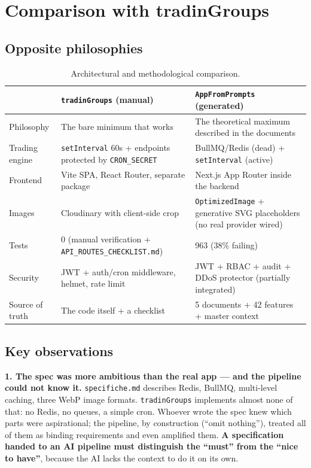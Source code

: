 \documentclass[11pt,a4paper]{article}
\newcommand{\file}[1]{\texttt{\small #1}}
\begin{document}
\section{Comparison with tradinGroups}

\subsection{Opposite philosophies}

\begin{table}[h!]
\centering
\small
\begin{tabular}{p{4.2cm}p{4.9cm}p{4.9cm}}
\toprule
& \textbf{\file{tradinGroups} (manual)} & \textbf{\file{AppFromPrompts} (generated)} \\
\midrule
Philosophy & The bare minimum that works & The theoretical maximum described in the documents \\
Trading engine & \file{setInterval} 60s + endpoints protected by \file{CRON\_SECRET} & BullMQ/Redis (dead) + \file{setInterval} (active) \\
Frontend & Vite SPA, React Router, separate package & Next.js App Router inside the backend \\
Images & Cloudinary with client-side crop & \file{OptimizedImage} + generative SVG placeholders (no real provider wired) \\
Tests & 0 (manual verification + \file{API\_ROUTES\_CHECKLIST.md}) & 963 (38\% failing) \\
Security & JWT + auth/cron middleware, helmet, rate limit & JWT + RBAC + audit + DDoS protector (partially integrated) \\
Source of truth & The code itself + a checklist & 5 documents + 42 features + master context \\
\bottomrule
\end{tabular}
\caption{Architectural and methodological comparison.}
\end{table}

\subsection{Key observations}

\textbf{1. The spec was more ambitious than the real app --- and the pipeline could not know it.} \file{specifiche.md} describes Redis, BullMQ, multi-level caching, three WebP image formats. \file{tradinGroups} implements almost none of that: no Redis, no queues, a simple cron. Whoever wrote the spec knew which parts were aspirational; the pipeline, by construction (``omit nothing''), treated all of them as binding requirements and even amplified them. \textbf{A specification handed to an AI pipeline must distinguish the ``must'' from the ``nice to have''}, because the AI lacks the context to do it on its own.
\end{document}
